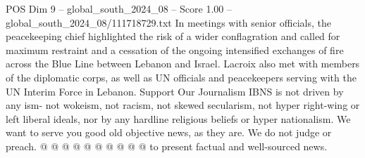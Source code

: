 \begin{textsample}{POS Dim 9 – global\_south\_2024\_08 – Score 1.00 – global\_south\_2024\_08/111718729.txt}
In meetings with senior officials, the peacekeeping chief highlighted the risk of a wider conflagration and called for maximum restraint and a cessation of the ongoing intensified exchanges of fire across the Blue Line between Lebanon and Israel.
Lacroix also met with members of the diplomatic corps, as well as UN officials and peacekeepers serving with the UN Interim Force in Lebanon.
Support Our Journalism IBNS is not driven by any ism- not wokeism, not racism, not skewed secularism, not hyper right-wing or left liberal ideals, nor by any hardline religious beliefs or hyper nationalism.
We want to serve you good old objective news, as they are.
We do not judge or preach. @ @ @ @ @ @ @ @ @ @ to present factual and well-sourced news.

\end{textsample}
